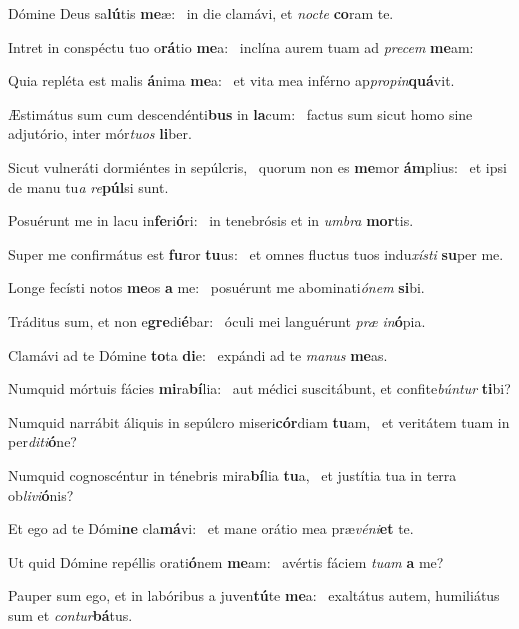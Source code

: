 \item Dómine Deus sa\textbf{lú}tis \textbf{me}æ:~\psstar{} in die clamávi, et \textit{nocte} \textbf{co}ram te.
\item Intret in conspéctu tuo o\textbf{rá}tio \textbf{me}a:~\psstar{} inclína aurem tuam ad \textit{precem} \textbf{me}am:
\item Quia repléta est malis \textbf{á}nima \textbf{me}a:~\psstar{} et vita mea inférno ap\textit{propin}\textbf{quá}vit.
\item Æstimátus sum cum descendénti\textbf{bus} in \textbf{la}cum:~\psstar{} factus sum sicut homo sine adjutório, inter mór\textit{tuos} \textbf{li}ber.
\item Sicut vulneráti dormiéntes in sepúlcris,~\pscross{} quorum non es \textbf{me}mor \textbf{ám}plius:~\psstar{} et ipsi de manu tu\textit{a} \textit{re}\textbf{púl}si sunt.
\item Posuérunt me in lacu in\textbf{fe}ri\textbf{ó}ri:~\psstar{} in tenebrósis et in \textit{umbra} \textbf{mor}tis.
\item Super me confirmátus est \textbf{fu}ror \textbf{tu}us:~\psstar{} et omnes fluctus tuos indu\textit{xísti} \textbf{su}per me.
\item Longe fecísti notos \textbf{me}os \textbf{a} me:~\psstar{} posuérunt me abominati\textit{ónem} \textbf{si}bi.
\item Tráditus sum, et non e\textbf{gre}di\textbf{é}bar:~\psstar{} óculi mei languérunt \textit{præ} \textit{in}\textbf{ó}pia.
\item Clamávi ad te Dómine \textbf{to}ta \textbf{di}e:~\psstar{} expándi ad te \textit{manus} \textbf{me}as.
\item Numquid mórtuis fácies \textbf{mi}ra\textbf{bí}lia:~\psstar{} aut médici suscitábunt, et confite\textit{búntur} \textbf{ti}bi?
\item Numquid narrábit áliquis in sepúlcro miseri\textbf{cór}diam \textbf{tu}am,~\psstar{} et veritátem tuam in per\textit{diti}\textbf{ó}ne?
\item Numquid cognoscéntur in ténebris mira\textbf{bí}lia \textbf{tu}a,~\psstar{} et justítia tua in terra ob\textit{livi}\textbf{ó}nis?
\item Et ego ad te Dómi\textbf{ne} cla\textbf{má}vi:~\psstar{} et mane orátio mea præ\textit{véni}\textbf{et} te.
\item Ut quid Dómine repéllis orati\textbf{ó}nem \textbf{me}am:~\psstar{} avértis fáciem \textit{tuam} \textbf{a} me?
\item Pauper sum ego, et in labóribus a juven\textbf{tú}te \textbf{me}a:~\psstar{} exaltátus autem, humiliátus sum et \textit{contur}\textbf{bá}tus.
